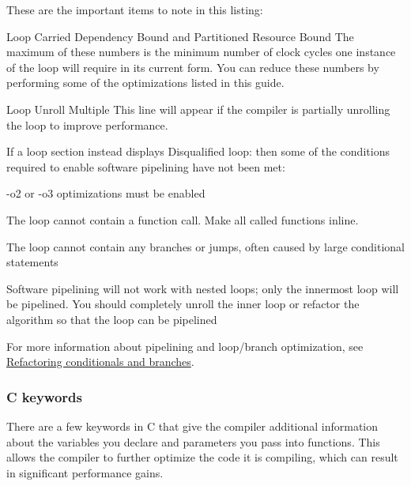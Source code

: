 These are the important items to note in this listing\+:


\begin{DoxyItemize}
\item {\ttfamily Loop Carried Dependency Bound} and {\ttfamily Partitioned Resource Bound}  The maximum of these numbers is the minimum number of clock cycles one instance of the loop will require in its current form. You can reduce these numbers by performing some of the optimizations listed in this guide.  


\item {\ttfamily Loop Unroll Multiple}  This line will appear if the compiler is partially unrolling the loop to improve performance.  


\end{DoxyItemize}

If a loop section instead displays {\ttfamily Disqualified loop}\+: then some of the conditions required to enable software pipelining have not been met\+:


\begin{DoxyItemize}
\item {\ttfamily -\/o2} or -\/{\ttfamily o3} optimizations must be enabled  
\item The loop cannot contain a function call. Make all called functions inline.  
\item The loop cannot contain any branches or jumps, often caused by large conditional statements  
\item Software pipelining will not work with nested loops; only the innermost loop will be pipelined. You should completely unroll the inner loop or refactor the algorithm so that the loop can be pipelined  
\end{DoxyItemize}

For more information about pipelining and loop/branch optimization, see \hyperlink{a00362_subsection__refactoring_conditionals_and_branches}{Refactoring conditionals and branches}.

\hypertarget{a00362_subsection__c_keywords}{}\subsubsection{C keywords}\label{a00362_subsection__c_keywords}
There are a few keywords in C that give the compiler additional information about the variables you declare and parameters you pass into functions. This allows the compiler to further optimize the code it is compiling, which can result in significant performance gains.

